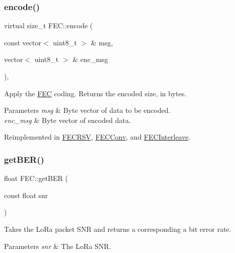 \subsubsection{\texorpdfstring{encode()}{encode()}}
{\footnotesize\ttfamily virtual size\+\_\+t F\+E\+C\+::encode (\begin{DoxyParamCaption}\item[{const vector$<$ uint8\+\_\+t $>$ \&}]{msg,  }\item[{vector$<$ uint8\+\_\+t $>$ \&}]{enc\+\_\+msg }\end{DoxyParamCaption})\hspace{0.3cm}{\ttfamily [inline]}, {\ttfamily [virtual]}}

Apply the \hyperlink{classFEC}{F\+EC} coding. Returns the encoded size, in bytes. 
\begin{DoxyParams}{Parameters}
{\em msg} & Byte vector of data to be encoded. \\
\hline
{\em enc\+\_\+msg} & Byte vector of encoded data. \\
\hline
\end{DoxyParams}


Reimplemented in \hyperlink{classFECRSV_ac9bd3fe4c494067e6f24a1287b0c562e}{F\+E\+C\+R\+SV}, \hyperlink{classFECConv_ae3e796d0e026dca718ed6384653a4564}{F\+E\+C\+Conv}, and \hyperlink{classFECInterleave_a10d868d7b117193667d0406edec2ef59}{F\+E\+C\+Interleave}.

\mbox{\label{classFEC_aaf1d4259c61fe117e086ad07871d22a3}} 
\subsubsection{\texorpdfstring{get\+B\+E\+R()}{getBER()}}
{\footnotesize\ttfamily float F\+E\+C\+::get\+B\+ER (\begin{DoxyParamCaption}\item[{const float}]{snr }\end{DoxyParamCaption})\hspace{0.3cm}{\ttfamily [static]}}

Takes the Lo\+Ra packet S\+NR and returns a corresponding a bit error rate. 
\begin{DoxyParams}{Parameters}
{\em snr} & The Lo\+Ra S\+NR. \\
\hline
\end{DoxyParams}
\mbox{\label{classFEC_a6504a5f7d5e1344538c25ed5481d0adb}} 
